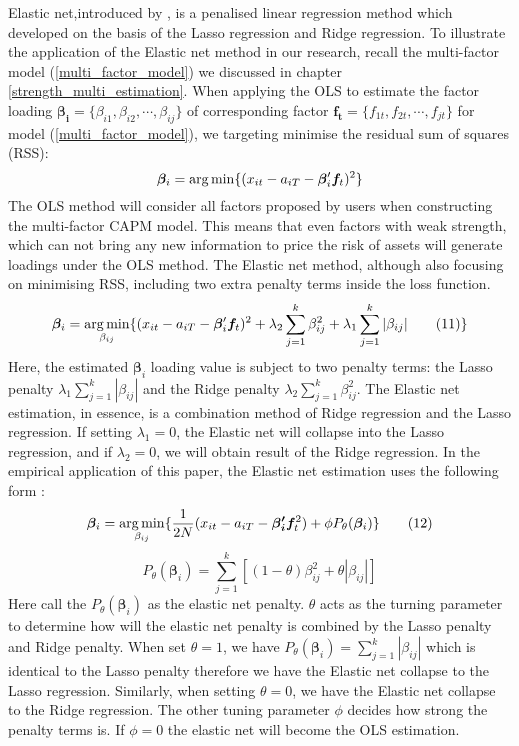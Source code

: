 Elastic net,introduced by ,  is a penalised linear regression method which developed on the basis of the Lasso regression \cite{Tibshirani1996} and Ridge regression.
To illustrate the application of the Elastic net method in our research, recall the multi-factor model (\ref{multi_factor_model}) we discussed in chapter \ref{strength_multi_estimation}.
When applying the OLS to estimate the factor loading $\bm{\beta_{i}} = \{ \beta_{i1}, \beta_{i2}, \cdots, \beta_{ij}   \}$ of corresponding factor $\bm{f_{t}} = \{ f_{1t}, f_{2t}, \cdots, f_{jt} \}$ for model (\ref{multi_factor_model}), we targeting minimise the residual sum of squares (RSS):
\[  \bm{\beta}_i =   \operatorname*{arg\,min}\{  (x_{it} - a_{iT} - \bm{\beta}_i^{\prime}\bm{f}_t )^2 \}    \]
The OLS method will consider all factors proposed by users when constructing the multi-factor CAPM model.
This means that even factors with weak strength, which can not bring any new information to price the risk of assets will generate loadings under the OLS method.
The Elastic net method, although also focusing on minimising RSS, including two extra penalty terms inside the loss function.
\[   \bm{\beta}_{i}  = \operatorname*{arg\,min}_{\beta_{ij}}\{ (x_{it} - a_{iT} - \bm{\beta}_{i} ^{\prime}\bm{f}_{t})^2 + \lambda_2\sum_{j = 1}^k\beta_{ij}^2  + \lambda_1\sum_{j=1}^k|\beta_{ij}|  \label{ENcriterion} \tag{11}   \}    \]
Here, the estimated $\bm{\beta}_i$ loading value is subject to two penalty terms: the Lasso penalty $\lambda_1\sum_{j=1}^k|\beta_{ij}|$ and the Ridge penalty $\lambda_2\sum_{j = 1}^k\beta_{ij}^2$.
The Elastic net estimation, in essence, is a combination method of Ridge regression and the Lasso regression.
If setting $\lambda_1 = 0$, the Elastic net will collapse into the Lasso regression, and if $\lambda_2 = 0$, we will obtain result of the Ridge regression.
In the empirical application of this paper, the Elastic net estimation uses the following form \cite{Friedman2010}:
\[		\bm{\beta}_{i} = \operatorname*{arg\,min}_{\beta_{ij}}\{ \frac{1}{2N} (x_{it}-a_{iT} - \bm{\beta_{i}^{\prime}}\bm{f}_t ^2 ) +\phi P_{\theta}(\bm{\beta}_i)  \} \label{EN:empirical_formula}\tag{12} \]
\[	P_{\theta}(\bm{\beta}_i) =\sum_{j=1}^k [ (1-\theta)\beta_{ij}^2 + \theta |\beta_{ij}|] \label{EN:elastic_net_penalty} \tag{13}\]
Here \citeauthor{Zou2005} call the $P_{\theta}(\bm{\beta}_{i})$ as the elastic net penalty.
$\theta$ acts as the turning parameter to determine how will the elastic net penalty is combined by the Lasso penalty and Ridge penalty.
When set $\theta = 1$, we have $P_{\theta}(\bm{\beta}_i) =\sum_{j=1}^k  |\beta_{ij}|$ which is identical to the Lasso penalty therefore we have the Elastic net collapse to the Lasso regression.
Similarly, when setting $\theta = 0$, we have the Elastic net collapse to the Ridge regression. 
The other tuning parameter $\phi$ decides how strong the penalty terms is.
If $\phi = 0$ the elastic net will become the OLS estimation.

